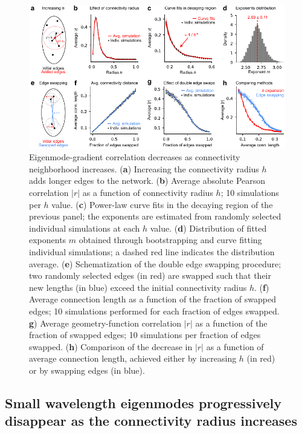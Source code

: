 \documentclass{article}
\begin{document}
\begin{figure}[t]
    \centering
    \includegraphics[width=1.0\linewidth]{figures/figure2.pdf}
    \caption{Eigenmode-gradient correlation decreases as connectivity neighborhood increases. (\textbf{a}) Increasing the connectivity radius $h$ adds longer edges to the network. (\textbf{b}) Average absolute Pearson correlation $|r|$ as a function of connectivity radius $h$; 10 simulations per $h$ value. (\textbf{c}) Power-law curve fits in the decaying region of the previous panel; the exponents are estimated from randomly selected individual simulations at each $h$ value. (\textbf{d}) Distribution of fitted exponents $m$ obtained through bootstrapping and curve fitting individual simulations; a dashed red line indicates the distribution average. (\textbf{e}) Schematization of the double edge swapping procedure; two randomly selected edges (in red) are swapped such that their new lengths (in blue) exceed the initial connectivity radius $h$. (\textbf{f}) Average connection length as a function of the fraction of swapped edges; 10 simulations performed for each fraction of edges swapped. \textbf{g}) Average geometry-function correlation $|r|$ as a function of the fraction of swapped edges; 10 simulations per fraction of edges swapped. (\textbf{h}) Comparison of the decrease in $|r|$ as a function of average connection length, achieved either by increasing $h$ (in red) or by swapping edges (in blue).}
    \label{fig2}
    \hrulefill
\end{figure}

\subsection*{Small wavelength eigenmodes progressively disappear as the connectivity radius increases}
\end{document}
